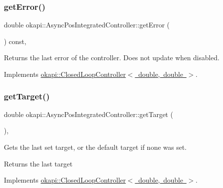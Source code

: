 \subsubsection{\texorpdfstring{getError()}{getError()}}
{\footnotesize\ttfamily double okapi\+::\+Async\+Pos\+Integrated\+Controller\+::get\+Error (\begin{DoxyParamCaption}{ }\end{DoxyParamCaption}) const\hspace{0.3cm}{\ttfamily [override]}, {\ttfamily [virtual]}}

Returns the last error of the controller. Does not update when disabled. 

Implements \mbox{\hyperlink{classokapi_1_1ClosedLoopController_a50c73444ff6e3e631951c43d0f951953}{okapi\+::\+Closed\+Loop\+Controller$<$ double, double $>$}}.

\mbox{\label{classokapi_1_1AsyncPosIntegratedController_a8d09fefb4a02fcb9d0352b4aa68821e3}} 
\subsubsection{\texorpdfstring{getTarget()}{getTarget()}}
{\footnotesize\ttfamily double okapi\+::\+Async\+Pos\+Integrated\+Controller\+::get\+Target (\begin{DoxyParamCaption}{ }\end{DoxyParamCaption})\hspace{0.3cm}{\ttfamily [override]}, {\ttfamily [virtual]}}

Gets the last set target, or the default target if none was set.

\begin{DoxyReturn}{Returns}
the last target 
\end{DoxyReturn}


Implements \mbox{\hyperlink{classokapi_1_1ClosedLoopController_a22012bedbfaff6e5a3a508f274ec2497}{okapi\+::\+Closed\+Loop\+Controller$<$ double, double $>$}}.

\mbox{\label{classokapi_1_1AsyncPosIntegratedController_a8774fe656abb2cf72d046b40ba3572a9}} 

